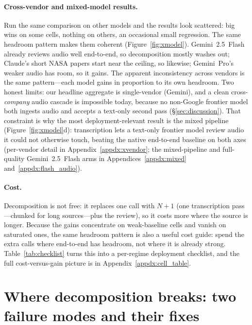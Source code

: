 \documentclass[11pt]{article}
\begin{document}
\paragraph{Cross-vendor and mixed-model results.}
Run the same comparison on other models and the results look scattered: big wins on some cells, nothing on others, an occasional small regression. The same headroom pattern makes them coherent (Figure~\ref{fig:xmodel}). Gemini~2.5~Flash already reviews audio well end-to-end, so decomposition mostly washes out; Claude's short NASA papers start near the ceiling, so likewise; Gemini~Pro's weaker audio has room, so it gains. The apparent inconsistency across vendors is the same pattern---each model gains in proportion to its own headroom. Two honest limits: our headline aggregate is single-vendor (Gemini), and a clean cross-\emph{company} audio cascade is impossible today, because no non-Google frontier model both ingests audio and accepts a text-only second pass (\S\ref{sec:discussion}). That constraint is why the most deployment-relevant result is the mixed pipeline (Figure~\ref{fig:xmodel}d): transcription lets a text-only frontier model review audio it could not otherwise touch, beating the native end-to-end baseline on both axes (per-vendor detail in Appendix~\ref{appdx:xvendor}; the mixed-pipeline and full-quality Gemini~2.5~Flash arms in Appendices~\ref{appdx:mixed} and~\ref{appdx:flash_audio}).

\paragraph{Cost.}
Decomposition is not free: it replaces one call with $N{+}1$ (one transcription pass---chunked for long sources---plus the review), so it costs more where the source is longer. Because the gains concentrate on weak-baseline cells and vanish on saturated ones, the same headroom pattern is also a useful cost guide: spend the extra calls where end-to-end has headroom, not where it is already strong. Table~\ref{tab:checklist} turns this into a per-regime deployment checklist, and the full cost-versus-gain picture is in Appendix~\ref{appdx:cell_table}.

\section{Where decomposition breaks: two failure modes and their fixes}
\label{sec:failure_modes}
\end{document}
